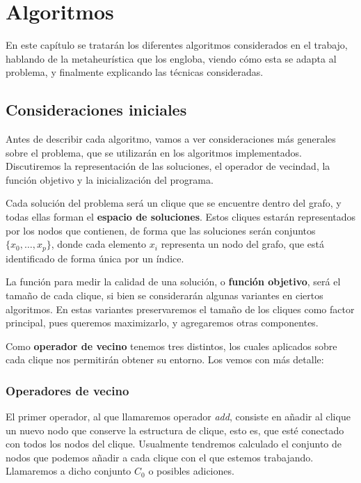 \chapter{Algoritmos}\label{ch:algoritmos}

En este capítulo se tratarán los diferentes algoritmos considerados en el trabajo,
hablando de la metaheurística que los engloba, viendo cómo esta se adapta al
problema, y finalmente explicando las técnicas consideradas.

\section{Consideraciones iniciales}

Antes de describir cada algoritmo, vamos a ver consideraciones más generales sobre el problema, que
se utilizarán en los algoritmos implementados. Discutiremos la representación de las soluciones, el
operador de vecindad, la función objetivo y la inicialización del programa.

Cada solución del problema será un clique que se encuentre dentro del grafo, y todas ellas forman el
\textbf{espacio de soluciones}. Estos cliques estarán representados por los nodos que contienen,
de forma que las soluciones serán conjuntos $\{x_0, \dots, x_p\}$, donde cada elemento
$x_i$ representa un nodo del grafo, que está identificado de forma única por un índice.

La función para medir la calidad de una solución, o \textbf{función objetivo}, será
el tamaño de cada clique, si bien se considerarán algunas variantes en ciertos algoritmos.
En estas variantes preservaremos el tamaño de los cliques como factor principal,
pues queremos maximizarlo, y agregaremos otras componentes.

Como \textbf{operador de vecino} tenemos tres distintos, los cuales aplicados sobre
cada clique nos permitirán obtener su entorno. Los vemos con más detalle:

\subsection{Operadores de vecino}

El primer operador, al que llamaremos operador \textit{add}, consiste en añadir al clique un
nuevo nodo que conserve la estructura de clique, esto es, que esté conectado con todos los
nodos del clique. Usualmente tendremos calculado el conjunto de nodos que podemos añadir
a cada clique con el que estemos trabajando. Llamaremos a dicho conjunto $C_0$ o posibles adiciones.

